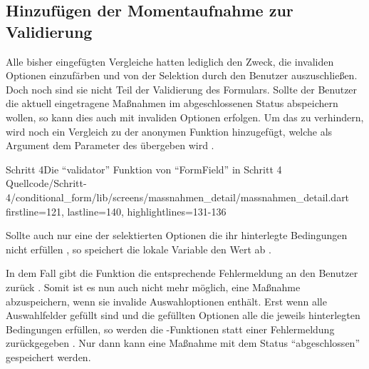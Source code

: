 \subsection{Hinzufügen der Momentaufnahme zur Validierung}

Alle bisher eingefügten Vergleiche hatten lediglich den Zweck,
die invaliden Optionen einzufärben und von der Selektion durch den Benutzer auszuschließen.
Doch noch sind sie nicht Teil der Validierung des Formulars.
Sollte der Benutzer die aktuell eingetragene Maßnahmen im abgeschlossenen Status abspeichern wollen,
so kann dies auch mit invaliden Optionen erfolgen.
Um das zu verhindern,
wird noch ein Vergleich zu der anonymen Funktion hinzugefügt,
welche als Argument dem Parameter  des  übergeben wird \Lst{\ref{lst:Schritt4validator}}.

\begin{alexlisting}{Schritt 4}{Die \enquote{validator} Funktion von \enquote{FormField} in Schritt 4}
  {Quellcode/Schritt-4/conditional_form/lib/screens/massnahmen_detail/massnahmen_detail.dart}
  {firstline=121, lastline=140, highlightlines={131-136}}
  \label{lst:Schritt4validator}
\end{alexlisting}

Sollte auch nur eine der selektierten Optionen  die ihr hinterlegte Bedingungen nicht erfüllen ,
so speichert die lokale Variable  den Wert  ab .

In dem Fall gibt die Funktion die entsprechende Fehlermeldung an den Benutzer zurück .
Somit ist es nun auch nicht mehr möglich,
eine Maßnahme abzuspeichern,
wenn sie invalide Auswahloptionen enthält.
Erst wenn alle Auswahlfelder gefüllt sind
und die gefüllten Optionen alle die jeweils hinterlegten Bedingungen erfüllen,
so werden die -Funktionen  statt einer Fehlermeldung zurückgegeben .
Nur dann kann eine Maßnahme mit dem Status \enquote{abgeschlossen} gespeichert werden.




